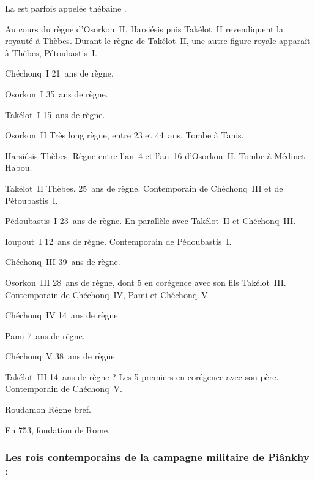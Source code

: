 La  est parfois appelée  \og thébaine \fg.

Au cours du règne d’Osorkon~II, Harsiésis puis Takélot~II revendiquent 
la royauté à Thèbes. Durant le règne de Takélot~II, une autre figure 
royale apparaît à Thèbes, Pétoubastis~I\ier. 


\begin{listerois}
  \item [\XIIA{} Chéchonq~I\ier] \num{21}~ans de règne.
  \item [\XIIA{} Osorkon~I\ier] \num{35}~ans de règne.
  \item [\XIIA{} Takélot~I\ier] \num{15}~ans de règne.
  \item [\XIIA{} Osorkon~II] Très long règne, entre \num{23} et 
        \num{44}~ans. Tombe à Tanis.
  \item [\XIIB{} Harsiésis] Thèbes. Règne entre l'an~\num{4} et 
        l'an~\num{16} d'Osorkon~II. Tombe à Médinet Habou.
  \item [\XIIB{} Takélot~II] Thèbes. \num{25}~ans de règne. 
        Contemporain de Chéchonq~III et de Pétoubastis~I\ier.
  \item [\XIIC{} Pédoubastis~I\ier] \num{23}~ans de règne. 
        En parallèle avec \XIIB Takélot~II et \XIIA Chéchonq~III.
  \item [\XIIC{} Ioupout~I\ier] \num{12}~ans de règne. Contemporain de 
        Pédoubastis~I\ier.
  \item [\XIIA{} Chéchonq~III] \num{39}~ans de règne.
  \item [\XIIB{} Osorkon~III] \num{28}~ans de règne, dont \num{5} en 
        corégence avec son fils Takélot~III. 
        Contemporain de Chéchonq~IV, Pami et Chéchonq~V.
  \item [\XIIA{} Chéchonq~IV] \num{14}~ans de règne.
  \item [\XIIA{} Pami] \num{7}~ans de règne.
  \item [\XIIA{} Chéchonq~V] \num{38}~ans de règne.
  \item [\XIIB{} Takélot~III] \num{14}~ans de règne ? Les \num{5} 
        premiers en corégence avec son père. 
        Contemporain de Chéchonq~V.
  \item [\XIIB{} Roudamon] Règne bref.
\end{listerois}

En 753, fondation de Rome.

\subsubsection{Les rois contemporains de la campagne militaire 
               de Piânkhy :}

